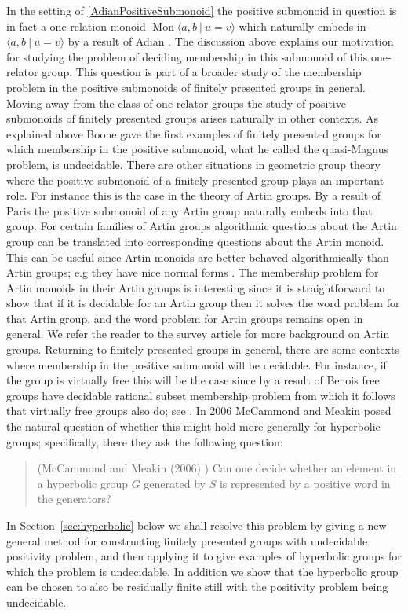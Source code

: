 \documentclass[11pt]{amsart}
\newcommand{\Mpres}[2]{\operatorname{Mon}\bigl\langle #1\:|\:#2 \bigr\rangle}
\newcommand{\Gpres}[2]{\bigl\langle #1\:|\:#2 \bigr\rangle}
\theoremstyle{plain}
\theoremstyle{definition}
\begin{document}
In the setting of \cref{AdianPositiveSubmonoid} the positive submonoid in question is in fact a one-relation monoid $\Mpres{a,b}{u=v}$ which naturally embeds in $\Gpres{a,b}{u=v}$ by a result of Adian \cite{adian1960embeddability}. The discussion above explains our motivation for studying the problem of deciding membership in this submonoid of this one-relator group. This question is part of a broader study of the membership problem in the positive submonoids of finitely presented groups in general. Moving away from the class of one-relator groups the study of positive submonoids of finitely presented groups arises naturally in other contexts. As explained above Boone gave the first examples of finitely presented groups for which membership in the positive submonoid, what he called the quasi-Magnus problem, is undecidable.   
There are other situations in geometric group theory where the positive submonoid of a finitely presented group plays an important role. For instance this is the case in the theory of Artin groups. By a result of Paris \cite{paris2002artin} the positive submonoid of any Artin group naturally embeds into that group. 
For certain families of Artin groups 
algorithmic questions about the Artin group can be translated into corresponding questions about the Artin monoid. This can be useful since Artin monoids are better behaved algorithmically than Artin groups; e.g they have nice normal forms \cite{brieskorn1972artin, michel1999note}. 
The membership problem for Artin monoids in their Artin groups is interesting since it is straightforward to show that if it is decidable for an Artin group then it solves the word problem for that Artin group, and the word problem for Artin groups remains open in general. 
We refer the reader to the survey article \cite{mccammond2017mysterious} for more background on Artin groups. 
Returning to finitely presented groups in general, there are some contexts where membership in the positive submonoid will be decidable. For instance, if the group is virtually free this will be the case since by a result of Benois \cite{Benois} 
free groups have decidable rational subset membership problem from which it follows that virtually free groups also do; see \cite{lohrey2015rational}. 
In 2006 McCammond and Meakin posed the natural question of whether this might hold more generally for hyperbolic groups; 
specifically, there they ask the following question: 

\begin{quote} (McCammond and Meakin (2006) \cite[Problem~1]{McCammondMeakin})
Can one decide whether an element in a hyperbolic group $G$ generated by $S$ is represented by a positive word in the generators?
\end{quote}
In Section~\ref{sec:hyperbolic} below we shall resolve this problem by giving 
a new general method for constructing finitely presented groups with undecidable positivity problem, and then applying it to give examples of hyperbolic groups for which the problem is undecidable. In addition we show that the hyperbolic group can be chosen to also be residually finite 
 still with the positivity problem being undecidable.
\end{document}
